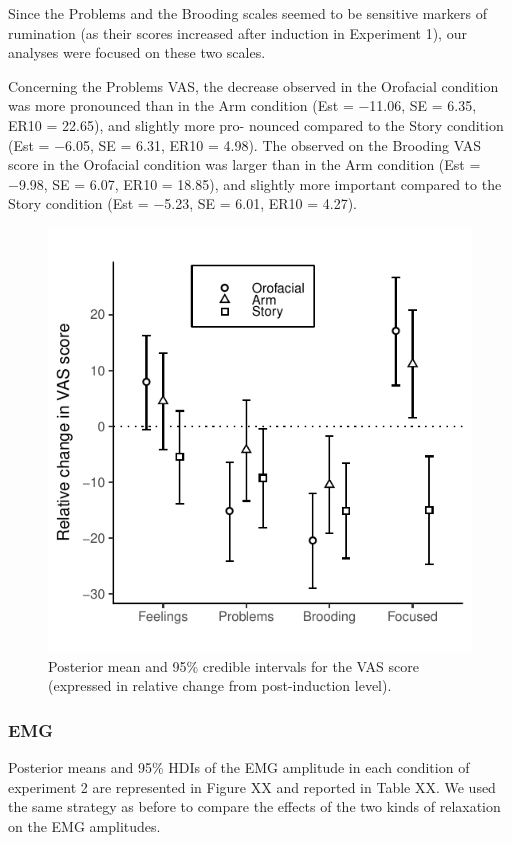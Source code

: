 \documentclass[a4paper,12pt,twoside,openright,oldfontcommands]{memoir}
\begin{document}
Since the Problems and the Brooding scales seemed to be sensitive
markers of rumination (as their scores increased after induction in
Experiment 1), our analyses were focused on these two scales.

Concerning the Problems VAS, the decrease observed in the Orofacial
condition was more pronounced than in the Arm condition (Est = −11.06,
SE = 6.35, ER10 = 22.65), and slightly more pro- nounced compared to the
Story condition (Est = −6.05, SE = 6.31, ER10 = 4.98). The observed on
the Brooding VAS score in the Orofacial condition was larger than in the
Arm condition (Est = −9.98, SE = 6.07, ER10 = 18.85), and slightly more
important compared to the Story condition (Est = −5.23, SE = 6.01, ER10
= 4.27).

\begin{figure}

{\centering \includegraphics[width=0.75\linewidth]{assets/emg_fig2} 

}

\caption{Posterior mean and 95\% credible intervals for the VAS score (expressed in relative change from post-induction level).}\label{fig:resultsemgfig2}
\end{figure}

\subsubsection{EMG}\label{emg-1}

Posterior means and 95\% HDIs of the EMG amplitude in each condition of
experiment 2 are represented in Figure XX and reported in Table XX. We
used the same strategy as before to compare the effects of the two kinds
of relaxation on the EMG amplitudes.
\end{document}
